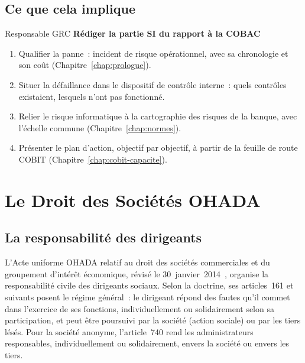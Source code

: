 \subsection{Ce que cela implique}

\begin{boxmetier}{Responsable GRC}
\textbf{Rédiger la partie SI du rapport à la COBAC}
\begin{enumerate}
    \item Qualifier la panne~: incident de risque opérationnel, avec sa
          chronologie et son coût (Chapitre~\ref{chap:prologue}).
    \item Situer la défaillance dans le dispositif de contrôle interne~:
          quels contrôles existaient, lesquels n'ont pas fonctionné.
    \item Relier le risque informatique à la cartographie des risques de la
          banque, avec l'échelle commune (Chapitre~\ref{chap:normes}).
    \item Présenter le plan d'action, objectif par objectif, à partir de la
          feuille de route COBIT (Chapitre~\ref{chap:cobit-capacite}).
\end{enumerate}
\end{boxmetier}

\section{Le Droit des Sociétés OHADA}
\label{sec:c10-ohada}

\subsection{La responsabilité des dirigeants}

L'Acte uniforme OHADA relatif au droit des sociétés commerciales et du
groupement d'intérêt économique, révisé le 30~janvier~2014~\cite{ohada2014auscgie},
organise la responsabilité civile des dirigeants sociaux. Selon la
doctrine, ses articles~161 et suivants posent le régime général~: le
dirigeant répond des fautes qu'il commet dans l'exercice de ses
fonctions, individuellement ou solidairement selon sa participation, et
peut être poursuivi par la société (action sociale) ou par les tiers
lésés. Pour la société anonyme, l'article~740 rend les administrateurs
responsables, individuellement ou solidairement, envers la société ou
envers les tiers.

